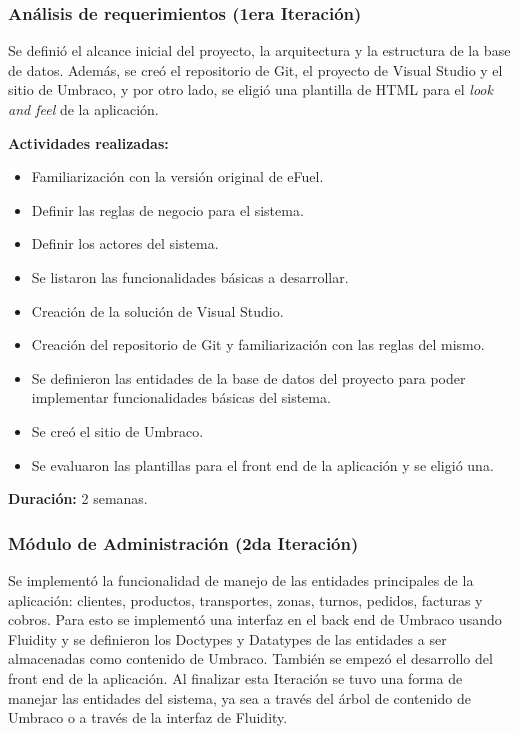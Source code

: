 \subsubsection{Análisis de requerimientos (1era Iteración)}
Se definió el alcance inicial del proyecto, la arquitectura y la estructura de la base de datos. Además, se creó el repositorio de Git, el proyecto de Visual Studio y el sitio de Umbraco, y por otro lado, se eligió una plantilla de HTML para el \emph{look and feel} de la aplicación.

\textbf{Actividades realizadas:}
\begin{itemize}
    \item Familiarización con la versión original de eFuel.
    \item Definir las reglas de negocio para el sistema.
    \item Definir los actores del sistema.
    \item Se listaron las funcionalidades básicas a desarrollar.
    \item Creación de la solución de Visual Studio.
    \item Creación del repositorio de Git y familiarización con las reglas del mismo.
    \item Se definieron las entidades de la base de datos del proyecto para poder implementar funcionalidades básicas del sistema.
    \item Se creó el sitio de Umbraco.
    \item Se evaluaron las plantillas para el front end de la aplicación y se eligió una.
\end{itemize}

\textbf{Duración:} 2 semanas.

\subsubsection{Módulo de Administración (2da Iteración)}
Se implementó la funcionalidad de manejo de las entidades principales de la aplicación: clientes, productos, transportes, zonas, turnos, pedidos, facturas y cobros. Para esto se implementó una interfaz en el back end de Umbraco usando Fluidity y se definieron los Doctypes y Datatypes de las entidades a ser almacenadas como contenido de Umbraco. También se empezó el desarrollo del front end de la aplicación. Al finalizar esta Iteración se tuvo una forma de manejar las entidades del sistema, ya sea a través del árbol de contenido de Umbraco o a través de la interfaz de Fluidity.

